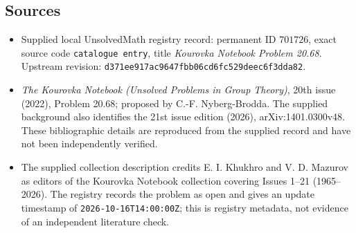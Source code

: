 \documentclass[11pt]{article}
\begin{document}
\subsection{Sources}
\begin{itemize}
\item Supplied local UnsolvedMath registry record: permanent ID \(701726\), exact source code \texttt{catalogue entry}, title \emph{Kourovka Notebook Problem 20.68}. Upstream revision: \texttt{d371ee917ac9647fbb06cd6fc529deec6f3dda82}.
\item \emph{The Kourovka Notebook (Unsolved Problems in Group Theory)}, 20th issue (2022), Problem 20.68; proposed by C.-F. Nyberg-Brodda. The supplied background also identifies the 21st issue edition (2026), arXiv:1401.0300v48. These bibliographic details are reproduced from the supplied record and have not been independently verified.
\item The supplied collection description credits E. I. Khukhro and V. D. Mazurov as editors of the Kourovka Notebook collection covering Issues 1--21 (1965--2026). The registry records the problem as open and gives an update timestamp of \texttt{2026-10-16T14:00:00Z}; this is registry metadata, not evidence of an independent literature check.
\end{itemize}
\end{document}
